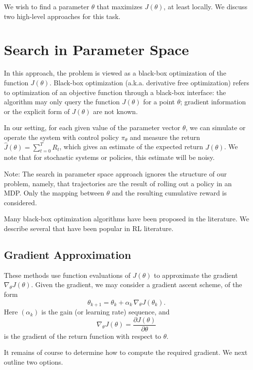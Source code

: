 We wish to find a parameter $\theta $ that maximizes $J(\theta )$, at least locally. We discuss two high-level approaches for this task.

\section{Search in Parameter Space}
In this approach, the problem is viewed as a black-box optimization of the function $J(\theta )$.
Black-box optimization (a.k.a. derivative free optimization) refers to optimization of an objective function through a black-box interface: the algorithm may only query the function $J(\theta )$ for a point $\theta$; gradient information or the explicit form of $J(\theta)$ are not known. 

In our setting, for each given value of the parameter vector $\theta $, we can simulate or operate the system with control policy ${\pi _\theta }$ and measure the return  $\hat J(\theta ) = \sum\nolimits_{t = 0}^T {{R_t}} $, which gives an estimate of the expected return $J(\theta )$. We note that for stochastic systems or policies, this estimate will be noisy.

Note: The search in parameter space approach ignores the structure of our problem, namely, that trajectories are the result of rolling out a policy in an MDP. Only the mapping between $\theta$ and the resulting cumulative reward is considered.

Many black-box optimization algorithms have been proposed in the literature. We describe several that have been popular in RL literature.

\subsection{Gradient Approximation}

These methods use function evaluations of $J(\theta )$ to approximate the gradient ${\nabla _\theta }J(\theta )$.
Given the gradient, we may consider a gradient ascent scheme, of the form
\begin{equation}\label{eq:grad_ascent_scheme}
{\theta _{k + 1}} = {\theta _k} + {\alpha _k}\,{\nabla _\theta }J({\theta _k}).
\end{equation}
Here  $({\alpha _k})$ is the gain (or learning rate) sequence, and
\[{\nabla _\theta }J(\theta ) = \frac{{\partial J(\theta )}}{{\partial \theta }}\]
is the gradient of the return function with respect to $\theta $.

It remains of course to determine how to compute the required gradient. We next outline two options.

